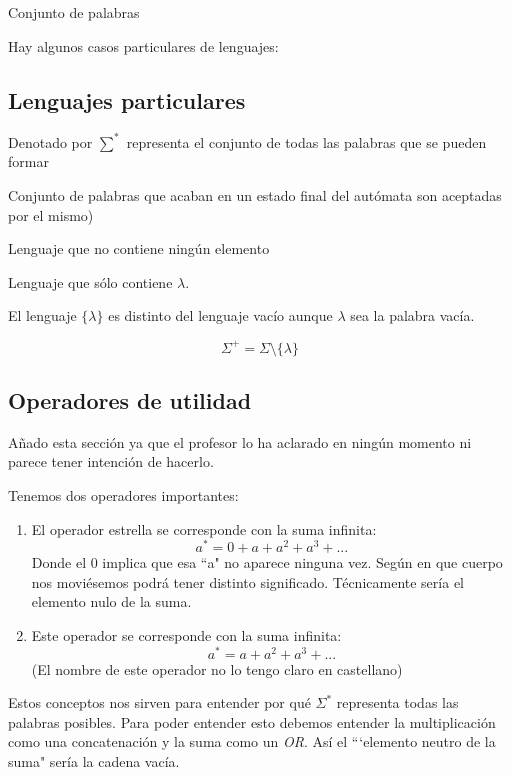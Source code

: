 \documentclass{apuntes}
\begin{document}
\begin{defn}[Lenguaje]
Conjunto de palabras
\end{defn}

Hay algunos casos particulares de lenguajes:
\subsection{Lenguajes particulares}
\begin{defn}
Denotado por $\sum^*$ representa el conjunto de todas las palabras que se pueden formar
\end{defn}

\begin{defn}
Conjunto de palabras que acaban en un estado final del autómata son aceptadas por el mismo)
\end{defn}

\begin{defn}
Lenguaje que no contiene ningún elemento
\end{defn}

\begin{defn}
Lenguaje que sólo contiene $\lambda$.
\end{defn}
El lenguaje $\lbrace \lambda \rbrace$ es distinto del lenguaje vacío aunque $\lambda$ sea la palabra vacía.

\begin{defn} 
\[ \Sigma^+ = \Sigma \setminus \lbrace \lambda \rbrace \]
\end{defn}

\subsection{Operadores de utilidad}
Añado esta sección ya que el profesor lo ha aclarado en ningún momento ni parece tener intención de hacerlo.

Tenemos dos operadores importantes:
\begin{enumerate}
\item \begin{defn}[Estrella]
El operador estrella se corresponde con la suma infinita:
\[a^* = 0 + a + a^2 + a^3 + ...\]
Donde el 0 implica que esa ``a" no aparece ninguna vez. Según en que cuerpo nos moviésemos podrá tener distinto significado. Técnicamente sería el elemento nulo de la suma.
\end{defn}
\item \begin{defn}[Suma]
Este operador se corresponde con la suma infinita:
\[a^* = a + a^2 + a^3 + ...\]
(El nombre de este operador no lo tengo claro en castellano)
\end{defn}
\end{enumerate}
Estos conceptos nos sirven para entender por qué $\Sigma ^*$  representa todas las palabras posibles. Para poder entender esto debemos entender la multiplicación como una concatenación y la suma como un \textit{OR}. Así el ```elemento neutro de la suma" sería la cadena vacía.
\end{document}
